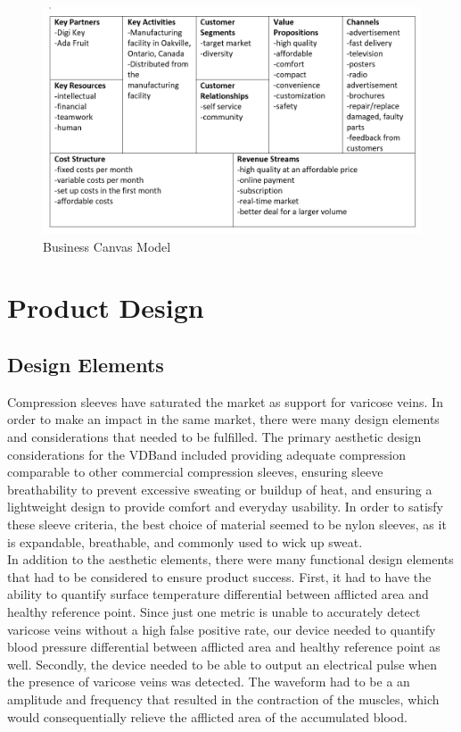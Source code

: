 \documentclass[11.5pt]{article}
\begin{document}
\begin{figure}[H]
    \centering
    \includegraphics[width=0.8\linewidth]{marketing/BCM.PNG}
    \caption{Business Canvas Model}
    \label{fig:BCM}
\end{figure}

\section{Product Design}


\subsection{Design Elements}
Compression sleeves have saturated the market as support for varicose veins. In order to make an impact in the same market, there were many design elements and considerations that needed to be fulfilled. The primary aesthetic design considerations for the VDBand included providing adequate compression comparable to other commercial compression sleeves, ensuring sleeve breathability to prevent excessive sweating or buildup of heat, and ensuring a lightweight design to provide comfort and everyday usability. In order to satisfy these sleeve criteria, the best choice of material seemed to be nylon sleeves, as it is expandable, breathable, and commonly used to wick up sweat.\\

In addition to the aesthetic elements, there were many functional design elements that had to be considered to ensure product success. First, it had to have the ability to quantify surface temperature differential between afflicted area and healthy reference point. Since just one metric is unable to accurately detect varicose veins without a high false positive rate, our device needed to quantify blood pressure differential between afflicted area and healthy reference point as well.
Secondly, the device needed to be able to output an electrical pulse when the presence of varicose veins was detected. The waveform had to be a an amplitude and frequency that resulted in the contraction of the muscles, which would consequentially relieve the afflicted area of the accumulated blood. \\
\end{document}
